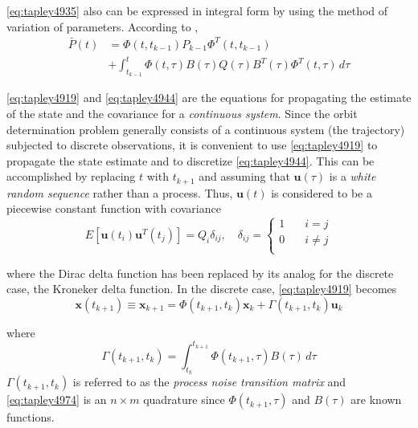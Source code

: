\ref{eq:tapley4935} also can be expressed in integral form by using the method
of variation of parameters. According to \cite{tapley},
\begin{equation}
	\label{eq:tapley4944}
	\begin{split}
		\bar{P}(t) & = \Phi (t , t_{k-1} ) P_{k-1} \Phi ^T (t , t_{k-1} ) \\
		&+  \int_{t_{k-1}}^{t} \Phi(t, \tau ) B (\tau ) Q (\tau ) B ^T (\tau ) \Phi ^T (t, \tau ) \, d\tau
	\end{split}
\end{equation}

\ref{eq:tapley4919} and \ref{eq:tapley4944} are the equations for propagating the estimate
of the state and the covariance for a \emph{continuous system}. Since the orbit determination
problem generally consists of a continuous system (the trajectory) subjected
to discrete observations, it is convenient to use \ref{eq:tapley4919} to propagate the state
estimate and to discretize \ref{eq:tapley4944}. This can be accomplished by replacing
\(t\) with \(t_{k+1}\) and assuming that \(\bm{u}(\tau )\) is a \emph{white random sequence}
rather than a process. Thus, \(\bm{u}(t)\) is considered to be a piecewise constant function
with covariance
\begin{equation}
	\label{eq:tapley4945}
	E \left[ \bm{u}(t_i) \bm{u}^T(t_j) \right] = Q_i \delta _{ij} ,
	\quad \delta _{ij} = \begin{cases}
		1 & \quad i = j    \\
		0 & \quad i \neq j \\
	\end{cases}
\end{equation}

where the Dirac delta function has been replaced by its analog for the discrete
case, the Kroneker delta function. In the discrete case, \ref{eq:tapley4919} becomes
\begin{equation}
	\bm{x} (t_{k+1}) \equiv \bm{x}_{k+1} = \Phi (t_{k+1}, t_k ) \bm{x}_k + \Gamma (t_{k+1}, t_k ) \bm{u}_k
\end{equation}

where
\begin{equation}
	\label{eq:tapley4947}
	\Gamma (t_{k+1}, t_k ) = \int_{t_k}^{t_{k+1}} \Phi (t_{k+1}, \tau ) B (\tau ) \, d\tau
\end{equation}
\(\Gamma (t_{k+1}, t_k )\) is referred to as the \emph{process noise transition matrix}
and \ref{eq:tapley4974} is an \(n \times m\) quadrature since \(\Phi (t_{k+1}, \tau )\)
and \(B (\tau )\) are known functions.

